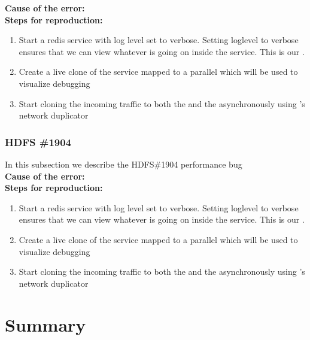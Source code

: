 \noindent \textbf{Cause of the error:} \\

\noindent \textbf{Steps for reproduction:} \\

\begin{adjustwidth}{0.5cm}{}
	\begin{enumerate}
		\item Start a redis service with log level set to verbose. Setting loglevel to verbose ensures that we can view whatever is going on inside the service. This is our \productioncontainer.
		\item Create a live clone of the service mapped to a parallel \debugcontainer which will be used to visualize debugging
		\item Start cloning the incoming traffic to both the \productioncontainer and the \debugcontainer asynchronously using \parikshan's network duplicator
	\end{enumerate}
\end{adjustwidth}


\subsubsection{HDFS \#1904}

In this subsection we describe the HDFS\#1904 performance bug \\

\noindent \textbf{Cause of the error:} \\

\noindent \textbf{Steps for reproduction:} \\

\begin{adjustwidth}{0.5cm}{}
	\begin{enumerate}
		\item Start a redis service with log level set to verbose. Setting loglevel to verbose ensures that we can view whatever is going on inside the service. This is our \productioncontainer.
		\item Create a live clone of the service mapped to a parallel \debugcontainer which will be used to visualize debugging
		\item Start cloning the incoming traffic to both the \productioncontainer and the \debugcontainer asynchronously using \parikshan's network duplicator
	\end{enumerate}
\end{adjustwidth}

\section{Summary}
\label{sec:parikshanCaseStudySummary}
